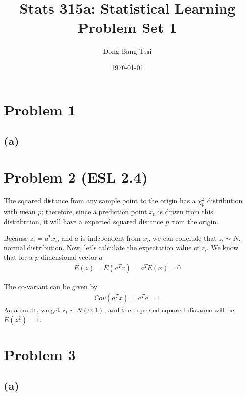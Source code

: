 \documentclass[pra,groupedaddress,amsmath,amssymb, column]{revtex4}
\begin{document}
\title{Stats 315a: Statistical Learning \\ Problem Set 1}
\author{Dong-Bang Tsai}



\date{\today}
\maketitle


\section*{Problem 1}
\subsection*{(a)}


\section*{Problem 2 (ESL 2.4)}
The squared distance from any sample point to the origin has a $\chi_p^2$ distribution with mean $p$; therefore, since a prediction point $x_0$ is drawn from this distribution, it will have a expected squared distance $p$ from the origin. 

Because $z_i=a^Tx_i$, and $a$ is independent from $x_i$, we can conclude that $z_i \sim N$, normal distribution. Now, let's calculate the expectation value of $z_i$. We know that for a $p$ dimensional vector $a$ 
\begin{align}
E(z) = E(a^Tx) = a^TE(x) = 0
\end{align}

The co-variant can be given by
\begin{align}
Cov(a^Tx) = a^Ta = 1
\end{align}
As a result, we get $z_i \sim N(0,1)$, and the expected squared distance will be $E(z^2) = 1$.



\section*{Problem 3}
\subsection*{(a)}
\end{document}
